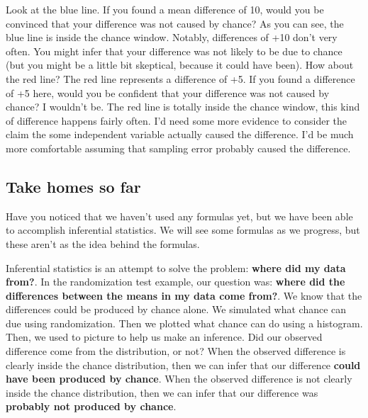 \documentclass[
]{book}
\begin{document}
Look at the blue line. If you found a mean difference of 10, would you be convinced that your difference was not caused by chance? As you can see, the blue line is inside the chance window. Notably, differences of +10 don't very often. You might infer that your difference was not likely to be due to chance (but you might be a little bit skeptical, because it could have been). How about the red line? The red line represents a difference of +5. If you found a difference of +5 here, would you be confident that your difference was not caused by chance? I wouldn't be. The red line is totally inside the chance window, this kind of difference happens fairly often. I'd need some more evidence to consider the claim the some independent variable actually caused the difference. I'd be much more comfortable assuming that sampling error probably caused the difference.

\subsection{Take homes so far}\label{take-homes-so-far}

Have you noticed that we haven't used any formulas yet, but we have been able to accomplish inferential statistics. We will see some formulas as we progress, but these aren't as the idea behind the formulas.

Inferential statistics is an attempt to solve the problem: \textbf{where did my data from?}. In the randomization test example, our question was: \textbf{where did the differences between the means in my data come from?}. We know that the differences could be produced by chance alone. We simulated what chance can due using randomization. Then we plotted what chance can do using a histogram. Then, we used to picture to help us make an inference. Did our observed difference come from the distribution, or not? When the observed difference is clearly inside the chance distribution, then we can infer that our difference \textbf{could have been produced by chance}. When the observed difference is not clearly inside the chance distribution, then we can infer that our difference was \textbf{probably not produced by chance}.
\end{document}
